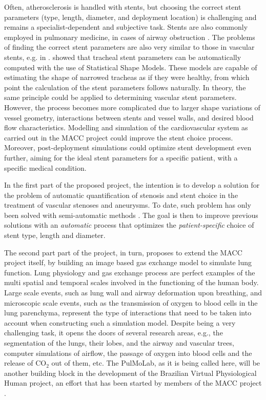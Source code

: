 Often, atherosclerosis is handled with stents, but choosing the correct stent parameters (type, length, diameter, and deployment location) is challenging and remains a specialist-dependent and subjective task. Stents are also commonly employed in pulmonary medicine, in cases of airway obstruction \citep{Chin,Freitag1,Freitag2,Freitag3,LeeP,Saito,Venuta}. The problems of finding the correct stent parameters are also very similar to those in vascular stents, e.g. in \citep{Bemmel}. \citet{Pinho:Trachea4} showed that tracheal stent parameters can be automatically computed with the use of Statistical Shape Models. These models are capable of estimating the shape of narrowed tracheas as if they were healthy, from which point the calculation of the stent parameters follows naturally. In theory, the same principle could be applied to determining vascular stent parameters. However, the process becomes more complicated due to larger shape variations of vessel geometry, interactions between stents and vessel walls, and desired blood flow characteristics. Modelling and simulation of the cardiovascular system as carried out in the MACC project could improve the stent choice process. Moreover, post-deployment simulations could optimize stent development even further, aiming for the ideal stent parameters for a specific patient, with a specific medical condition. 

In the first part of the proposed project, the intention is to develop a solution for the problem of automatic quantification of stenosis and stent choice in the treatment of vascular stenoses and aneurysms. To date, such problem has only been solved with semi-automatic methods \citep{Gremse01092011,Scherl200721,HERN-06b,Bemmel}. The goal is then to improve previous solutions with an {\em automatic} process that optimizes the {\em patient-specific} choice of stent type, length and diameter. 

The second part part of the project, in turn, proposes to extend the MACC project itself, by building an image based gas exchange model to simulate lung function. Lung physiology and gas exchange process are perfect examples of the multi spatial and temporal scales involved in the functioning of the human body. Large scale events, such as lung wall and airway deformation upon breathing, and microscopic scale events, such as the transmission of oxygen to blood cells in the lung parenchyma, represent the type of interactions that need to be taken into account when constructing such a simulation model. Despite being a very challenging task, it opens the doors of several research areas, e.g., the segmentation of the lungs, their lobes, and the airway and vascular trees, computer simulations of airflow, the passage of oxygen into blood cells and the release of CO$_2$ out of them, etc. The PulMoLab, as it is being called here, will be another building block in the development of the Brazilian Virtual Physiological Human project, an effort that has been started by members of the MACC project \citep{Blanco2010,Blanco2009a,Blanco2012,Urquiza2006}. 

